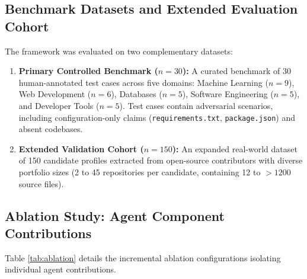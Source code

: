 \documentclass[conference]{IEEEtran}
\begin{document}
\subsection{Benchmark Datasets and Extended Evaluation Cohort}
The framework was evaluated on two complementary datasets:
\begin{enumerate}
    \item \textbf{Primary Controlled Benchmark ($n=30$):} A curated benchmark of 30 human-annotated test cases across five domains: Machine Learning ($n=9$), Web Development ($n=6$), Databases ($n=5$), Software Engineering ($n=5$), and Developer Tools ($n=5$). Test cases contain adversarial scenarios, including configuration-only claims (\texttt{requirements.txt}, \texttt{package.json}) and absent codebases.
    \item \textbf{Extended Validation Cohort ($n=150$):} An expanded real-world dataset of 150 candidate profiles extracted from open-source contributors with diverse portfolio sizes (2 to 45 repositories per candidate, containing 12 to $>1200$ source files).
\end{enumerate}

\subsection{Ablation Study: Agent Component Contributions}
Table \ref{tab:ablation} details the incremental ablation configurations isolating individual agent contributions.

\begin{table}[htbp]
\caption{Multi-Agent Pipeline Component Ablation Study}
\label{tab:ablation}
\centering
{}
\end{table}
\end{document}
